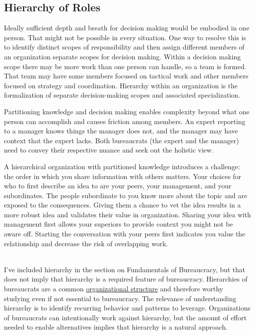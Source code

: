 \subsection*{Hierarchy of Roles\label{sec:hierarchy-of-roles}}

Ideally sufficient depth and breath for decision making would be embodied in one person. That might not be possible in every situation. One way to resolve this is to identify distinct scopes of responsibility and then assign different members of an organization separate scopes for decision making. Within a decision making scope there may be more work than one person can handle, so a team is formed. That team may have some members focused on tactical work and other members focused on strategy and coordination. Hierarchy within an organization is the formalization of separate decision-making scopes and associated specialization. 

Partitioning knowledge and decision making enables complexity beyond what one person can accomplish and causes friction among members. An expert reporting to a manager knows things the manager does not, and the manager may have context that the expert lacks. Both bureaucrats (the expert and the manager) need to convey their respective nuance and seek out the holistic view.

A hierarchical organization with partitioned knowledge introduces a challenge: the order in which you share information with others matters. Your choices for who to first describe an idea to are your peers, your management, and your subordinates.  The people subordinate to you know more about the topic and are exposed to the consequences. Giving them a chance to vet the idea results in a more robust idea and validates their value in organization. Sharing your idea with management first allows your superiors to provide context you might not be aware off. Starting the conversation with your peers first indicates you value the relationship and decrease the risk of overlapping work.

\ \\

I've included hierarchy in the section on Fundamentals of Bureaucracy, but that does not imply that hierarchy is a required feature of bureaucracy. Hierarchies of bureaucrats are a common \href{https://en.wikipedia.org/wiki/Organizational_structure}{organizational structure} and therefore worthy studying even if not essential to bureaucracy. The relevance of understanding hierarchy is to identify recurring behavior and patterns to leverage.
Organizations of bureaucrats can intentionally work against hierarchy, but the amount of effort needed to enable alternatives implies that hierarchy is a natural approach.

